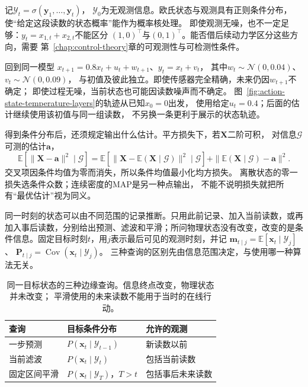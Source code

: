 记$\mathcal Y_t=\sigma(\bm y_1,\ldots,\bm y_t)$，
$\mathcal Y_0$为无观测信息。欧氏状态与观测具有正则条件分布，
使“给定这段读数的状态概率”能作为概率核处理。
即使观测无噪，也不一定足够：$y_t=x_{1,t}+x_{2,t}$不能区分
$(1,0)^\top$与$(0,1)^\top$。能否借后续动力学区分这些方向，需要
第~\ref{chap:control-theory}章的可观测性与可检测性条件。

\begin{example}[带泄漏温度的间接观测]
 \label{ex:dynamical-noisy-temperature}
 回到同一模型
 $x_{t+1}=0.8x_t+u_t+w_{t+1}$、$y_t=x_t+v_t$，
 其中$w_t\sim\mathcal N(0,0.04)$、$v_t\sim\mathcal N(0,0.09)$，
 与初值及彼此独立。即使传感器完全精确，未来仍因$w_{t+1}$不确定；
 即使过程无噪，当前状态也可能因读数噪声而不确定。
 图~\ref{fig:action-state-temperature-layers}的轨迹从已知$x_0=0$出发，
 使用给定$u_t=0.4$；后面的估计继续使用该初值与同一组读数，
 不另换一条更利于展示的状态轨迹。
\end{example}

得到条件分布后，还须规定输出什么估计。平方损失下，若$\bm X$二阶可积，
对信息$\mathcal G$可测的估计$\bm a$，
\[
 \mathbb E[\|\bm X-\bm a\|^2\mid\mathcal G]
 =\mathbb E[\|\bm X-\mathbb E(\bm X\mid\mathcal G)\|^2\mid\mathcal G]
       +\|\mathbb E(\bm X\mid\mathcal G)-\bm a\|^2.
\]
交叉项因条件均值为零而消失，所以条件均值最小化均方损失。
离散状态的零一损失选条件众数；连续密度的MAP是另一种点输出，
不能不说明损失就把所有“最优估计”视为同义。

\label{sec:dynamical-kalman-rts}

同一时刻的状态可以由不同范围的记录推断。只用此前记录、加入当前读数，或再加入事后读数，分别给出预测、滤波和平滑；所问物理状态没有改变，改变的是条件信息。固定目标时刻$t$，用$j$表示最后可见的观测时刻，并记
$\bm m_{t\mid j}=\mathbb E[\bm x_t\mid\mathcal Y_j]$、
$\bm P_{t\mid j}=\operatorname{Cov}(\bm x_t\mid\mathcal Y_j)$。
三种查询的区别先由信息范围决定，与使用哪一种算法无关。

\begin{table}[htbp]
 \centering
 \begin{tabularx}{\linewidth}{lXX}
 \toprule
 查询 & 目标条件分布 & 允许的观测\\
 \midrule
 一步预测 & $P(\bm x_t\mid\mathcal Y_{t-1})$ & 新读数以前\\
 当前滤波 & $P(\bm x_t\mid\mathcal Y_t)$ & 包括当前读数\\
 固定区间平滑 & $P(\bm x_t\mid\mathcal Y_T)$，$T>t$ & 包括事后未来读数\\
 \bottomrule
 \end{tabularx}
 \caption{同一目标状态的三种边缘查询。信息终点改变，物理状态并未改变；
 平滑使用的未来读数不能用于当时的在线行动。}
 \label{tab:dynamical-estimation-information}
\end{table}

